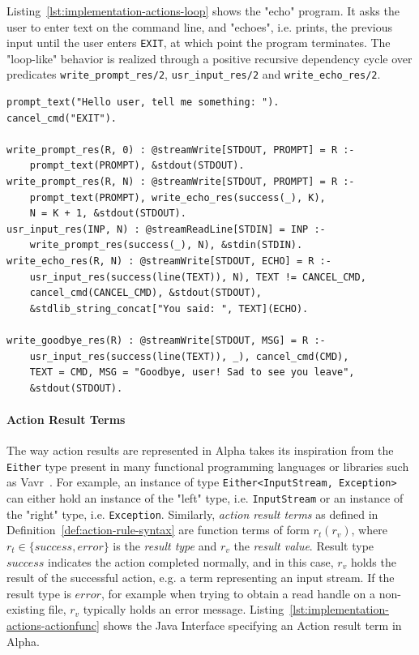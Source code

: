 \begin{example}
\label{ex:implementation-actions-loop}
Listing~\ref{lst:implementation-actions-loop} shows the "echo" program. It asks the user to enter text on the command line, and "echoes", i.e. prints, the previous input until the user enters \texttt{EXIT}, at which point the program terminates. The "loop-like" behavior is realized through a positive recursive dependency cycle over predicates \texttt{write\_prompt\_res/2}, \texttt{usr\_input\_res/2} and \texttt{write\_echo\_res/2}.

\begin{lstlisting}[style=asp-code, label={lst:implementation-actions-loop}, caption={An "echo" application which echoes user input written using Evolog actions.}]
prompt_text("Hello user, tell me something: ").
cancel_cmd("EXIT").
    
write_prompt_res(R, 0) : @streamWrite[STDOUT, PROMPT] = R :- 
    prompt_text(PROMPT), &stdout(STDOUT).
write_prompt_res(R, N) : @streamWrite[STDOUT, PROMPT] = R :- 
    prompt_text(PROMPT), write_echo_res(success(_), K), 
    N = K + 1, &stdout(STDOUT).
usr_input_res(INP, N) : @streamReadLine[STDIN] = INP :- 
    write_prompt_res(success(_), N), &stdin(STDIN).
write_echo_res(R, N) : @streamWrite[STDOUT, ECHO] = R :- 
    usr_input_res(success(line(TEXT)), N), TEXT != CANCEL_CMD, 
    cancel_cmd(CANCEL_CMD), &stdout(STDOUT),
    &stdlib_string_concat["You said: ", TEXT](ECHO).
        
write_goodbye_res(R) : @streamWrite[STDOUT, MSG] = R :- 
    usr_input_res(success(line(TEXT)), _), cancel_cmd(CMD), 
    TEXT = CMD, MSG = "Goodbye, user! Sad to see you leave", 
    &stdout(STDOUT).   
\end{lstlisting}    

\end{example}    


\paragraph{Action Result Terms} The way action results are represented in Alpha takes its inspiration from the \texttt{Either} type present in many functional programming languages or libraries such as Vavr~\cite{vavr-io}. For example, an instance of type \texttt{Either<InputStream, Exception>}
can either hold an instance of the "left" type, i.e. \texttt{InputStream} or an instance of the "right" type, i.e. \texttt{Exception}. Similarly, \emph{action result terms} as defined in Definition~\ref{def:action-rule-syntax} are function terms of form $r_t(r_v)$, where $r_t \in \{success, error\}$ is the \emph{result type} and $r_v$ the \emph{result value}. Result type $success$ indicates the action completed normally, and in this case, $r_v$ holds the result of the successful action, e.g. a term representing an input stream. If the result type is $error$, for example when trying to obtain a read handle on a non-existing file, $r_v$ typically holds an error message.
Listing~\ref{lst:implementation-actions-actionfunc} shows the Java Interface specifying an Action result term in Alpha.

